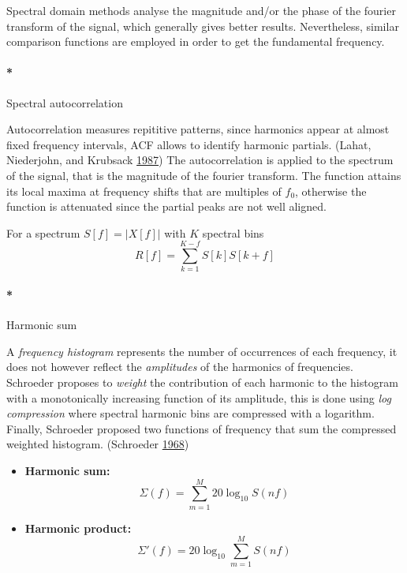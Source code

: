 \documentclass[
  american,
]{article}
\providecommand{\tightlist}{%
  \setlength{\itemsep}{0pt}\setlength{\parskip}{0pt}}
\let\oldparagraph\paragraph
\renewcommand{\paragraph}[1]{\oldparagraph*{#1}}
\begin{document}
Spectral domain methods analyse the magnitude and/or the phase
of the fourier transform of the signal,
which generally gives better results.
Nevertheless, similar comparison functions are employed
in order to get the fundamental frequency.

\hypertarget{spectral-autocorrelation}{%
\paragraph*{Spectral autocorrelation}\label{spectral-autocorrelation}}

Autocorrelation measures repititive patterns, since harmonics
appear at almost fixed frequency intervals, ACF allows
to identify harmonic partials. (Lahat, Niederjohn, and Krubsack \protect\hyperlink{ref-lahat_spectral_1987}{1987})
The autocorrelation is applied to the spectrum of the signal,
that is the magnitude of the fourier transform.
The function attains its local maxima at frequency shifts
that are multiples of \(f_0\), otherwise the function
is attenuated since the partial peaks are not well aligned.

For a spectrum \(S[f]=\left\lvert X[f]\right\rvert\) with \(K\) spectral bins
\[R[f] = \sum_{k=1}^{K-f} S[k]S[k+f]\]

\hypertarget{harmonic-sum}{%
\paragraph*{Harmonic sum}\label{harmonic-sum}}

A \emph{frequency histogram} represents the number of occurrences
of each frequency, it does not however reflect the \emph{amplitudes}
of the harmonics of frequencies.
Schroeder proposes to \emph{weight} the contribution of each harmonic
to the histogram with a monotonically increasing function
of its amplitude, this is done using \emph{log compression}
where spectral harmonic bins are compressed with a logarithm.
Finally, Schroeder proposed two functions of frequency that
sum the compressed weighted histogram. (Schroeder \protect\hyperlink{ref-schroeder_period_1968}{1968})

\begin{itemize}
\tightlist
\item
  \textbf{Harmonic sum:} \[\Sigma(f)=\sum_{m=1}^M 20\log_{10}S(nf)\]
\item
  \textbf{Harmonic product:} \[\Sigma'(f)=20\log_{10}\sum_{m=1}^M S(nf)\]
\end{itemize}
\end{document}
